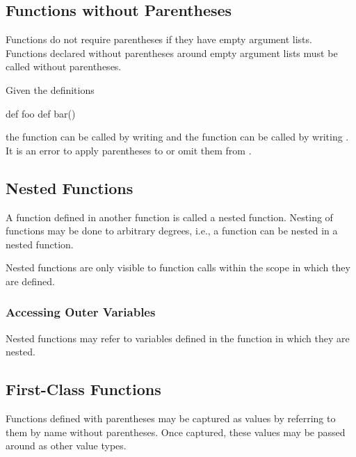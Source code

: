 \subsection{Functions without Parentheses}
\label{Functions_without_Parentheses}

Functions do not require parentheses if they have empty argument
lists.  Functions declared without parentheses around empty argument
lists must be called without parentheses.

\begin{example}
Given the definitions
\begin{chapel}
def foo { }
def bar() { }
\end{chapel}
the function  can be called by writing  and the
function  can be called by writing .  It is an
error to apply parentheses to  or omit them from .
\end{example}

\subsection{Nested Functions}
\label{Nested_Functions}

A function defined in another function is called a nested function.
Nesting of functions may be done to arbitrary degrees, i.e., a
function can be nested in a nested function.

Nested functions are only visible to function calls within the scope
in which they are defined.

\subsubsection{Accessing Outer Variables}
\label{Accessing_Outer_Variables}

Nested functions may refer to variables defined in the function in
which they are nested.

\subsection{First-Class Functions}
\label{First_Class_Functions}

Functions defined with parentheses may be captured as values by referring to them by name without parentheses.  Once captured, these values may be passed around as other value types.

